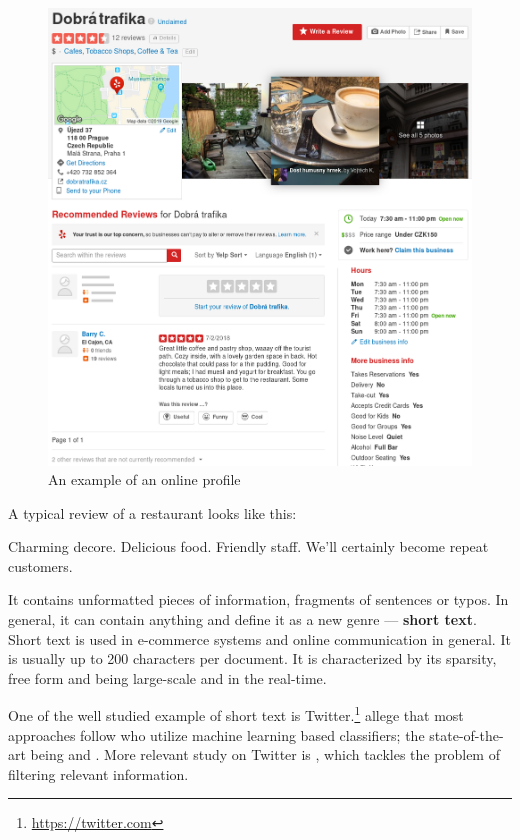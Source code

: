 \begin{figure}[ht]\centering
\includegraphics[width=130mm]{../img/dobra_trafika.png}
\caption{An example of an online profile}
\label{fig:dobra_trafika}
\end{figure}

A typical review of a restaurant looks like this:

\begin{code}
Charming decore. Delicious food. Friendly staff.
We'll certainly become repeat customers.
\end{code}

It contains unformatted pieces of information, fragments of sentences or typos.
In general, it can contain anything and \citet{Song14} define it as a new genre --- \textbf{short text}.
Short text is used in e-commerce systems and online communication in general.
It is usually up to 200 characters per document.
It is characterized by its sparsity, free form and being large-scale and in the real-time.

One of the well studied example of short text is Twitter.\footnote{\url{https://twitter.com}}
\citet{jiang2011target} allege that most approaches follow
\citet{pang2002thumbs} who utilize machine learning based classifiers;
the state-of-the-art being \citet{go2009twitter} and \citet{barbosa2010robust}.
More relevant study on Twitter is \citep{sriram2010short},
which tackles the problem of filtering relevant information.

